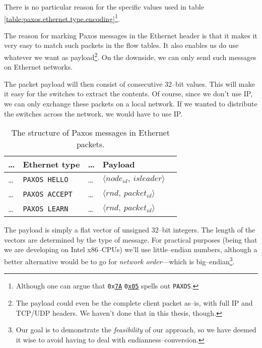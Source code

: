 There is no particular reason for the specific values used in table
\ref{table:paxos.ethernet.type.encoding}\footnote{Although one can argue
that \texttt{0x\underline{7A}} \texttt{0\underline{x05}} spells out \texttt{PAXOS}.}.

The reason for marking Paxos messages in the Ethernet header is that it
makes it very easy to match such packets in the flow tables.  It also
enables us do use whatever we want as payload\footnote{The payload could
even be the complete client packet as--is, with full IP and TCP/UDP
headers.  We haven't done that in this thesis, though.}.  On the downside,
we can only send such messages on Ethernet networks.

The packet payload will then consist of consecutive 32--bit values.
This will make it easy for the switches to extract the contents.
Of course, since we don't use IP, we can only exchange these packets on a
local network.  If we wanted to distribute the switches across the network,
we would have to use IP.

\begin{table}[H]
  \centering
  \begin{tabular}{l|l|l|l|l|}
    \hline \dots & \textbf{Ethernet type} & \dots & \textbf{Payload} \\
    \hline \dots & \texttt{PAXOS HELLO}  & \dots & $ \langle node_{id},\ isleader \rangle $ \\
    \hline \dots & \texttt{PAXOS ACCEPT} & \dots & $ \langle rnd,\ packet_{id} \rangle $ \\
    \hline \dots & \texttt{PAXOS LEARN}  & \dots & $ \langle rnd,\ packet_{id} \rangle $ \\
    \hline
  \end{tabular}

  \caption{The structure of Paxos messages in Ethernet packets.}
  \label{table:paxos.ethernet.packet}
\end{table}

The payload is simply a flat vector of unsigned 32--bit integers.  The length
of the vectors are determined by the type of message.  For practical
purposes (being that we are developing on Intel x86--CPUs) we'll use
little--endian numbers, although a better alternative would be to go for
\textit{network order}---which is big--endian\footnote{Our goal is to
demonstrate the \textit{feasibility} of our approach, so we have deemed it
wise to avoid having to deal with endianness--conversion.}.

